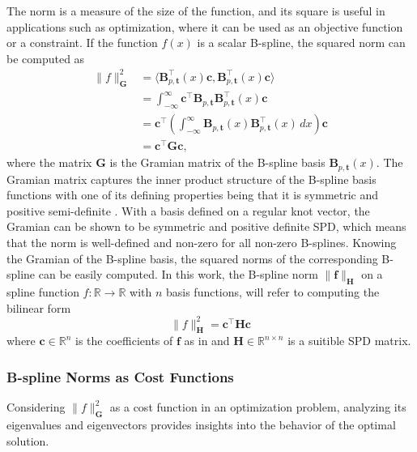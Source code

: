 The norm is a measure of the size of the function, and its square is useful in applications such as optimization, where it can be used as an objective function or a constraint. If the function $f(x)$ is a scalar B-spline, the squared norm can be computed as
\begin{equation}
    \label{eq:norm-spline}
    \begin{aligned}
        \|f\|_\mathbf G^2 &= \langle\mathbf B_{p, \mathbf t}^\top(x) \mathbf c, \mathbf B_{p, \mathbf t}^\top(x) \mathbf c\rangle \\
        &= \int_{-\infty}^\infty \mathbf c^\top \mathbf B_{p, \mathbf t}\mathbf B_{p, \mathbf t}^\top(x) \mathbf c \\
        &= \mathbf c^\top \left(\int_{-\infty}^\infty \mathbf B_{p, \mathbf t}(x) \mathbf B_{p, \mathbf t}^\top(x) \, dx\right) \mathbf c \\
        &= \mathbf c^\top \mathbf G \mathbf c,
\end{aligned}
\end{equation}
where the matrix $\mathbf G$ is the Gramian matrix of the B-spline basis $\mathbf B_{p, \mathbf t}(x)$. The Gramian matrix captures the inner product structure of the B-spline basis functions with one of its defining properties being that it is symmetric and positive semi-definite \citep{horn2013positive}. With a basis defined on a regular knot vector, the Gramian can be shown to be symmetric and positive definite \acrshort{SPD}, which means that the norm is well-defined and non-zero for all non-zero B-splines.  Knowing the Gramian of the B-spline basis, the squared norms of the corresponding B-spline can be easily computed. In this work, the B-spline norm $\|\mathbf f\|_\mathbf H$ on a spline function $f: \mathbb R\to\mathbb R$ with $n$ basis functions, will refer to computing the bilinear form
\begin{equation}\label{eq:b-spline-norm}
    \|f\|_\mathbf H^2 = \mathbf{c}^\top \mathbf H \mathbf {c}
\end{equation}
where $\mathbf{c}\in\mathbb R^{n}$ is the coefficients of $\mathbf f$ as in and $\mathbf H\in\mathbb R^{n\times n}$ is a suitible SPD matrix. 


\subsubsection{B-spline Norms as Cost Functions}\label{sec:b-spline-norms-as-cost-functions}
Considering $\|f\|_\mathbf G^2$ as a cost function in an optimization problem, analyzing its eigenvalues and eigenvectors provides insights into the behavior of the optimal solution.


